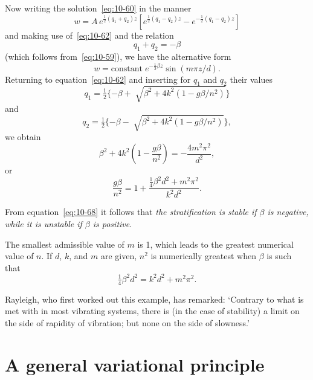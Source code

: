 Now writing the solution~\eqref{eq:10-60} in the manner
\begin{equation}
\label{eq:10-63}
w = A\,e^{\frac{1}{2}(q_1+q_2)z}[e^{\frac{1}{2}(q_1-q_2)z}-e^{-\frac{1}{2}(q_1-q_2)z}]
\end{equation}
and making use of~\eqref{eq:10-62} and the relation
\begin{equation}
\label{eq:10-64}
q_1+q_2 = -\beta
\end{equation}
(which follows from~\eqref{eq:10-59}), we have the alternative form
\begin{equation}
\label{eq:10-65}
w = \text{constant}\; e^{-\frac{1}{2}\beta z}\sin(m\pi z/d).
\end{equation}
Returning to equation~\eqref{eq:10-62} and inserting for $q_1$ and $q_2$ their values
\begin{equation}
\label{eq:10-66}
q_1 = \tfrac{1}{2}\{-\beta+\sqrt[\phantom{x}]{\beta^2+4k^2(1-g\beta/n^2)}\}
\end{equation}
and
\begin{equation}
\label{eq:10-67}
q_2 = \tfrac{1}{2}\{-\beta-\sqrt[\phantom{x}]{\beta^2+4k^2(1-g\beta/n^2)}\},
\end{equation}
we obtain
\begin{equation}
\label{eq:10-68}
\beta^2+4k^2\!\left(1-\frac{g\beta}{n^2}\right) = -\frac{4m^2\pi^2}{d^2},
\end{equation}
or
\begin{equation}
\label{eq:10-69}
\frac{g\beta}{n^2} = 1+\frac{\frac{1}{4}\beta^2 d^2+m^2\pi^2}{k^2 d^2}.
\end{equation}

From equation~\eqref{eq:10-68} it follows that \emph{the stratification is stable if $\beta$ is negative, while it is unstable if $\beta$ is positive}.

The smallest admissible value of $m$ is 1, which leads to the greatest numerical value of $n$. If $d$, $k$, and $m$ are given, $n^2$ is numerically greatest when $\beta$ is such that
\begin{equation}
\label{eq:10-70}
\tfrac{1}{4}\beta^2 d^2 = k^2d^2+m^2\pi^2.
\end{equation}

Rayleigh, who first worked out this example, has remarked: `Contrary to what is met with in most vibrating systems, there is (in the case of stability) a limit on the side of rapidity of vibration; but none on the side of slowness.'

\section{A general variational principle}\label{sec:93}

